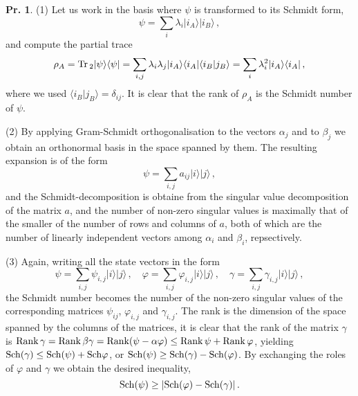 \documentclass[a4paper,12pt]{article}
\def\Tr{\ensuremath{\mathop{\rm Tr}}{}}
\def\Rank{\ensuremath{\mathop{\rm Rank}}}
\theoremstyle{definition}
\newtheorem{problem}{Pr.}[section]
\begin{document}
\begin{problem}
 (1) Let us work in the basis where $\psi$ is transformed to its Schmidt form,
 \[
  \psi = \sum_i \lambda_i |i_A\rangle|i_B\rangle\,,
 \]
 and compute the partial trace
 \[
  \rho_A = \Tr_2 |\psi\rangle\langle\psi| = \sum_{i,j} \lambda_i\lambda_j |i_A\rangle\langle i_A| \langle i_B| j_B\rangle = \sum_i \lambda_i^2 |i_A\rangle\langle i_A|\,,
 \]
 where we used $\langle i_B|j_B\rangle = \delta_{ij}$. It is clear that the rank of $\rho_A$ is the Schmidt number of $\psi$.

 (2) By applying Gram-Schmidt orthogonalisation to the vectors $\alpha_j$ and to $\beta_j$ we obtain an orthonormal basis in the space spanned by them. The resulting expansion is of the form
 \[
  \psi = \sum_{i,j} a_{ij}|i\rangle|j\rangle\,,
 \]
 and the Schmidt-decomposition is obtaine from the singular value decomposition of the matrix $a$, and the number of non-zero singular values is maximally that of the smaller of the number of rows and columns of $a$, both of which are the number of linearly independent vectors among $\alpha_i$ and $\beta_i$, repsectively.

 (3) Again, writing all the state vectors in the form
 \[
  \psi = \sum_{i,j}\psi_{i,j}|i\rangle|j\rangle\,,\quad \varphi = \sum_{i,j}\varphi_{i,j}|i\rangle|j\rangle\,,\quad \gamma=\sum_{i,j}\gamma_{i,j}|i\rangle|j\rangle\,,
 \]
 the Schmidt number becomes the number of the non-zero singular values of the corresponding matrices $\psi_{ij}$, $\varphi_{i,j}$ and $\gamma_{i,j}$. The rank is the dimension of the space spanned by the columns of the matrices, it is clear that the rank of the matrix $\gamma$ is $\Rank \gamma = \Rank \beta \gamma = \Rank (\psi-\alpha\varphi) \le \Rank \psi + \Rank \varphi$, yielding ${\rm Sch}(\gamma) \le {\rm Sch}(\psi) + {\rm Sch}\varphi$, or ${\rm Sch}(\psi)\ge {\rm Sch}(\gamma) - {\rm Sch}(\varphi)$. By exchanging the roles of $\varphi$ and $\gamma$ we obtain the desired inequality,
 \[
  {\rm Sch}(\psi) \ge |{\rm Sch}(\varphi) - {\rm Sch}(\gamma)|\,.
 \]
\end{problem}
\end{document}
